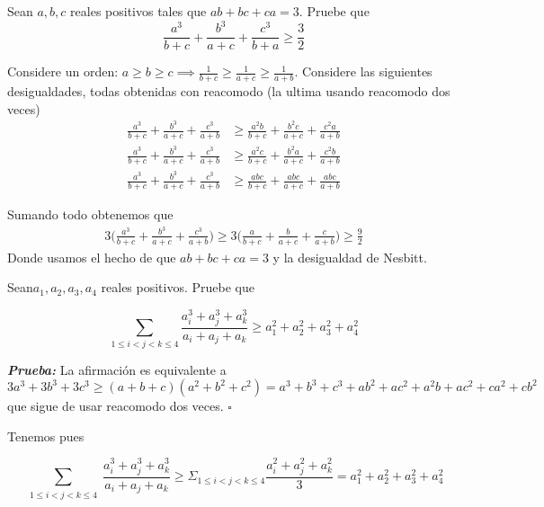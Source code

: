 \begin{ejer}
	Sean $a,b,c$ reales positivos tales que $ab+bc+ca=3$. Pruebe que
	\begin{equation}
	\frac{a^{3}}{b+c} + \frac{b^{3}}{a+c} + \frac{c^{3}}{b+a}  \geq \frac{3}{2} 
	\end{equation}
\end{ejer}

\begin{sol}
	Considere un orden: $a \geq b \geq c\implies \frac{1}{b+c} \geq \frac{1}{a+c} \geq \frac{1}{a+b} $. Considere las siguientes desigualdades, todas obtenidas con reacomodo (la ultima usando reacomodo dos veces)
	\begin{align}
	\frac{a^3}{b+c}+\frac{b^3}{a+c} + \frac{c^3}{a+b} & \geq \frac{a^2b}{b+c}+\frac{b^2c}{a+c} + \frac{c^2a}{a+b}\\
	\frac{a^3}{b+c}+\frac{b^3}{a+c} + \frac{c^3}{a+b} & \geq \frac{a^2c}{b+c}+\frac{b^2a}{a+c} + \frac{c^2b}{a+b}\\
	\frac{a^3}{b+c}+\frac{b^3}{a+c} + \frac{c^3}{a+b} & \geq \frac{abc}{b+c}+\frac{abc}{a+c} + \frac{abc}{a+b}
	\end{align}
	
	Sumando todo obtenemos que 
	\begin{align}
	3\bigg(\frac{a^3}{b+c}+\frac{b^3}{a+c} + \frac{c^3}{a+b}\bigg) \geq 3 \bigg(\frac{a}{b+c}+\frac{b}{a+c} + \frac{c}{a+b}\bigg) \geq \frac{9}{2}
	\end{align}
	Donde usamos el hecho de que $ab+bc+ca = 3 $ y la desigualdad de Nesbitt.
\end{sol}

\begin{ejer}
    Sean$ a_1,a_2,a_3,a_4$ reales positivos. Pruebe que
    
    \begin{equation}
    \sum_{1 \leq i < j < k \leq 4} \frac{a_{i}^{3} + a_{j}^{3} + a_{k}^{3}}{a_{i} + a_{j} + a_{k}} \geq a_{1}^{2} + a_{2}^{2} + a_{3}^{2} + a_{4}^{2}
    \end{equation} 
\end{ejer}
\begin{sol}
	\begin{lem}
		
	\end{lem}
	\textbf{\textit{Prueba:}} La afirmaci\'on es equivalente a $3a^3+3b^3+3c^3 \geq (a+b+c)(a^2+b^2+c^2) = a^3+b^3+c^3+ab^2+ac^2+a^2b+ac^2+ca^2+cb^2$ que sigue de usar reacomodo dos veces. $\square$
	
	Tenemos pues 

	\begin{equation}
		\sum_{\substack{1\leq i < j < k \leq 4}} \frac{a_{i}^3+a_{j}^{3}+a_{k}^{3}}{a_{i}+a_{j}+a_{k}} \geq \Sigma_{1\leq i < j < k \leq 4} \frac{a_{i}^2+a_{j}^{2}+a_{k}^{2}}{3} = a_{1}^{2}+a_{2}^{2}+a_{3}^{2}+a_{4}^{2}
	\end{equation} 
\end{sol}

